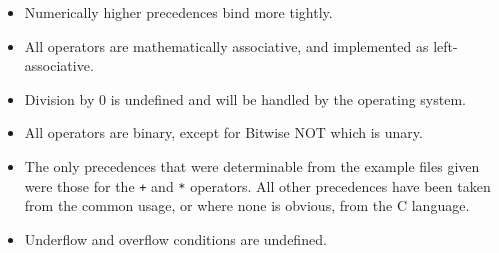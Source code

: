 \documentclass[a4wide, 11pt]{article}
\begin{document}
\begin{itemize}
\item Numerically higher precedences bind more tightly.

\item All operators are mathematically associative, and implemented as
left-associative.

\item Division by 0 is undefined and will be handled by the operating system.

\item All operators are binary, except for Bitwise NOT which is unary.

\item The only precedences that were determinable from the example files given
were those for the \verb|+| and \verb|*| operators. All other precedences have
been taken from the common usage, or where none is obvious, from the C language.

\item Underflow and overflow conditions are undefined.
\end{itemize}
\end{document}
